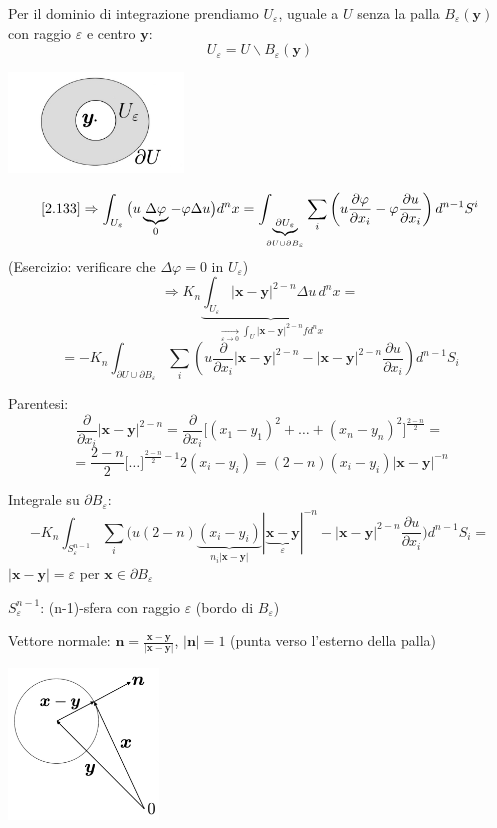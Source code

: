 \documentclass[a4paper,11pt]{report}
\newcommand{\vect}[1]{\boldsymbol{#1}}
\newcommand{\x}{\boldsymbol{x}}
\newcommand{\y}{\boldsymbol{y}}
\begin{document}
Per il dominio di integrazione prendiamo $U_\varepsilon$, uguale a $U$ senza la palla $B_\varepsilon(\y)$ con raggio $\varepsilon$ e centro $\y$:
\[
U_\varepsilon = U \smallsetminus B_\varepsilon(\y)
\]
\begin{center}
\includegraphics[width=0.35\textwidth]{immagini/insiemeuepsilon}
\end{center}
\[
\eqref{2.133} \Rightarrow \int_{U_\varepsilon} \big(u \underbrace{\Delta\varphi}_{0} - \varphi \Delta u\big)d^n x=\int_{\underbrace{\scriptstyle \partial U_\varepsilon}_{\partial U \cup \partial B_\varepsilon}} \sum_i \left( u\frac{\partial \varphi}{\partial x_i} - \varphi \frac{\partial u}{\partial x_i}\right)d^{n-1}S^i
\]
(Esercizio: verificare che $\Delta \varphi = 0$ in $U_\varepsilon$)
\[
\Rightarrow K_n \underbrace{\int_{U_\varepsilon}|\x-\y|^{2-n} \Delta u \,d^n x}_{\underset{\varepsilon \to 0}{\longrightarrow}\int_U |\x - \y|^{2-n}f d^n x}=
\]
\begin{equation}
=-K_n \int_{\partial U \cup \partial B_\varepsilon}\sum_i \left(u\frac{\partial}{\partial x_i}|\x-\y|^{2-n} - |\x-\y|^{2-n}\frac{\partial u}{\partial x_i} \right)d^{n-1}S_i
\label{2.134}
\end{equation}

\medskip

Parentesi:
\[
\frac{\partial}{\partial x_i}|\x - \y|^{2-n}=\frac{\partial}{\partial x_i}\big[ (x_1-y_1)^2 + \ldots + (x_n - y_n)^2\big]^{\frac{2-n}{2}}=
\]
\[
=\frac{2-n}{2} \big[\ldots \big]^{\frac{2-n}{2}-1} 2(x_i-y_i)=(2-n)(x_i-y_i)|\x-\y|^{-n}
\]

\medskip

Integrale su $\partial B_\varepsilon$:
\[
-K_n\int_{S^{n-1}_\varepsilon}\sum_i\Big(u(2-n) \underbrace{(x_i-y_i)}_{n_i |\x - \y|} |\underbrace{\x - \y}_{\varepsilon}|^{-n}-|\x-\y|^{2-n}\frac{\partial u}{\partial x_i}\Big) d^{n-1}S_i=
\]
$|\x-\y|=\varepsilon$ per $\x \in \partial B_\varepsilon$

$S_\varepsilon^{n-1}$: (n-1)-sfera con raggio $\varepsilon$ (bordo di $B_\varepsilon$)

Vettore normale: $\vect{n}=\frac{\x - \y}{|\x-\y|}$, $|\vect{n}|=1$ (punta verso l'esterno della palla)

\begin{center}
\includegraphics[width=0.3\textwidth]{immagini/bepsilon}
\end{center}
\end{document}
